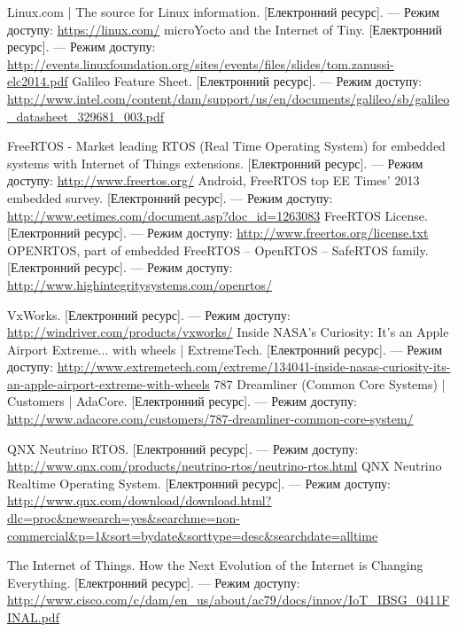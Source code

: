 \documentclass[oneside,14pt,a4paper,final]{myextreport}
\newcommand{\eresource}[2]{#1. [Електронний ресурс]. --- Режим доступу: \url{#2}}
\begin{document}
\begin{thebibliography}{00}
    \eresource{Linux.com | The source for Linux information}{https://linux.com/}
    \eresource{microYocto and the Internet of Tiny}{http://events.linuxfoundation.org/sites/events/files/slides/tom.zanussi-elc2014.pdf}
    \eresource{Galileo Feature Sheet}{http://www.intel.com/content/dam/support/us/en/documents/galileo/sb/galileo\_datasheet\_329681\_003.pdf}

    \eresource{FreeRTOS - Market leading RTOS (Real Time Operating System) for embedded systems with Internet of Things extensions}{http://www.freertos.org/}
    \eresource{Android, FreeRTOS top EE Times' 2013 embedded survey}{http://www.eetimes.com/document.asp?doc\_id=1263083}
    \eresource{FreeRTOS License}{http://www.freertos.org/license.txt}
    \eresource{OPENRTOS, part of embedded FreeRTOS -- OpenRTOS -- SafeRTOS family}{http://www.highintegritysystems.com/openrtos/}

    \eresource{VxWorks}{http://windriver.com/products/vxworks/}
    \eresource{Inside NASA's Curiosity: It's an Apple Airport Extreme... with wheels | ExtremeTech}{http://www.extremetech.com/extreme/134041-inside-nasas-curiosity-its-an-apple-airport-extreme-with-wheels}
    \eresource{787 Dreamliner (Common Core Systems) | Customers | AdaCore}{http://www.adacore.com/customers/787-dreamliner-common-core-system/}

    \eresource{QNX Neutrino RTOS}{http://www.qnx.com/products/neutrino-rtos/neutrino-rtos.html}
    \eresource{QNX Neutrino Realtime Operating System}{http://www.qnx.com/download/download.html?dlc=proc&newsearch=yes&searchme=non-commercial&p=1&sort=bydate&sorttype=desc&searchdate=alltime}

    \eresource{The Internet of Things. How the Next Evolution of the Internet is Changing Everything}{http://www.cisco.com/c/dam/en\_us/about/ac79/docs/innov/IoT\_IBSG\_0411FINAL.pdf}
\end{thebibliography}
\end{document}
